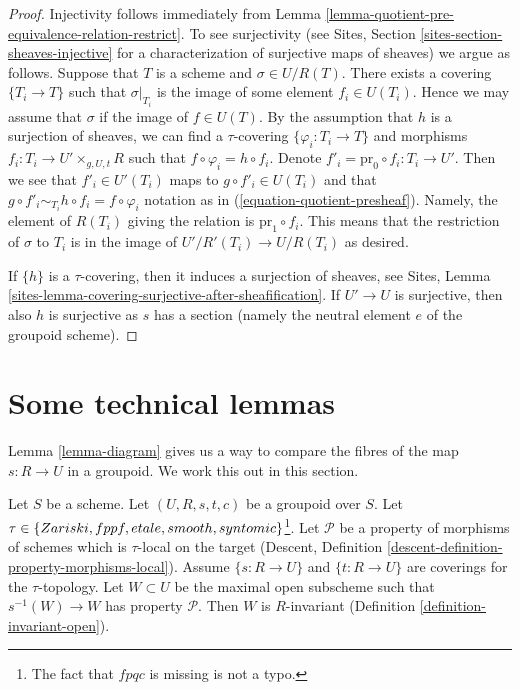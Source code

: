 \begin{proof}
Injectivity follows immediately from
Lemma \ref{lemma-quotient-pre-equivalence-relation-restrict}.
To see surjectivity (see
Sites, Section \ref{sites-section-sheaves-injective}
for a characterization of surjective maps of sheaves) we argue as follows.
Suppose that $T$ is a scheme and $\sigma \in U/R(T)$.
There exists a covering $\{T_i \to T\}$ such that $\sigma|_{T_i}$
is the image of some element $f_i \in U(T_i)$. Hence we
may assume that $\sigma$ if the image of $f \in U(T)$.
By the assumption that $h$ is a surjection of sheaves, we
can find a $\tau$-covering $\{\varphi_i : T_i \to T\}$ and morphisms
$f_i : T_i \to U' \times_{g, U, t} R$ such that
$f \circ \varphi_i = h \circ f_i$. Denote
$f'_i = \text{pr}_0 \circ f_i : T_i \to U'$. Then we see that
$f'_i \in U'(T_i)$ maps to $g \circ f'_i \in U(T_i)$ and
that $g \circ f'_i \sim_{T_i} h \circ f_i = f \circ \varphi_i$
notation as in (\ref{equation-quotient-presheaf}). Namely, the
element of $R(T_i)$ giving the relation is $\text{pr}_1 \circ f_i$.
This means that the restriction
of $\sigma$ to $T_i$ is in the image of $U'/R'(T_i) \to U/R(T_i)$
as desired.

\medskip\noindent
If $\{h\}$ is a $\tau$-covering, then it induces a surjection of sheaves, see
Sites, Lemma \ref{sites-lemma-covering-surjective-after-sheafification}.
If $U' \to U$ is surjective, then also $h$ is surjective as $s$ has a section
(namely the neutral element $e$ of the groupoid scheme).
\end{proof}












\section{Some technical lemmas}
\label{section-technical-lemma}

\noindent
Lemma \ref{lemma-diagram} gives us a way to compare the fibres of the map
$s : R \to U$ in a groupoid. We work this out in this section.

\begin{lemma}
\label{lemma-property-invariant}
Let $S$ be a scheme.
Let $(U, R, s, t, c)$ be a groupoid over $S$.
Let $\tau \in \{Zariski,\linebreak[0] fppf, \linebreak[0] etale,\linebreak[0]
smooth,\linebreak[0] syntomic\}$\footnote{The fact that $fpqc$ is missing
is not a typo.}. Let $\mathcal{P}$ be a property of morphisms of schemes
which is $\tau$-local on the target
(Descent, Definition \ref{descent-definition-property-morphisms-local}).
Assume $\{s : R \to U\}$ and $\{t : R \to U\}$ are coverings for the
$\tau$-topology. Let $W \subset U$ be the maximal open subscheme such that
$s^{-1}(W) \to W$ has property $\mathcal{P}$.
Then $W$ is $R$-invariant (Definition \ref{definition-invariant-open}).
\end{lemma}

